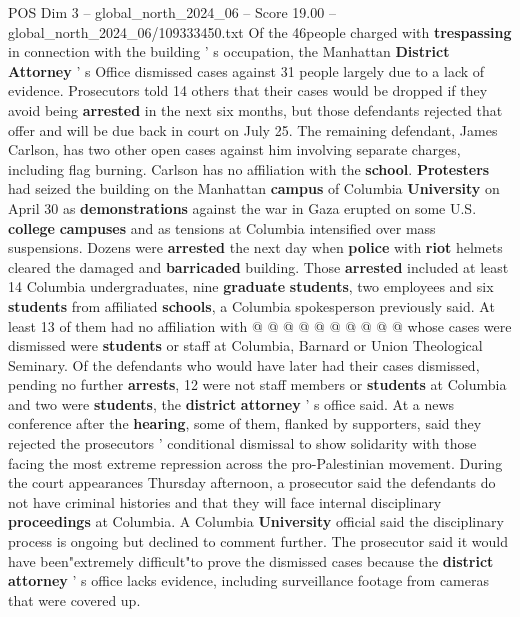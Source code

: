 \begin{textsample}{POS Dim 3 – global\_north\_2024\_06 – Score 19.00 – global\_north\_2024\_06/109333450.txt}  \label{ex:f3_pos_080}
Of the 46people charged with \textbf{trespassing} in connection with the building ' s occupation, the Manhattan \textbf{District} \textbf{Attorney} ' s Office dismissed cases against 31 people largely due to a lack of evidence.
Prosecutors told 14 others that their cases would be dropped if they avoid being \textbf{arrested} in the next six months, but those defendants rejected that offer and will be due back in court on July 25.
The remaining defendant, James Carlson, has two other open cases against him involving separate charges, including flag burning.
Carlson has no affiliation with the \textbf{school}. \textbf{Protesters} had seized the building on the Manhattan \textbf{campus} of Columbia \textbf{University} on April 30 as \textbf{demonstrations} against the war in Gaza erupted on some U.S. \textbf{college} \textbf{campuses} and as tensions at Columbia intensified over mass suspensions.
Dozens were \textbf{arrested} the next day when \textbf{police} with \textbf{riot} helmets cleared the damaged and \textbf{barricaded} building.
Those \textbf{arrested} included at least 14 Columbia undergraduates, nine \textbf{graduate} \textbf{students}, two employees and six \textbf{students} from affiliated \textbf{schools}, a Columbia spokesperson previously said.
At least 13 of them had no affiliation with @ @ @ @ @ @ @ @ @ @ whose cases were dismissed were \textbf{students} or staff at Columbia, Barnard or Union Theological Seminary.
Of the defendants who would have later had their cases dismissed, pending no further \textbf{arrests}, 12 were not staff members or \textbf{students} at Columbia and two were \textbf{students}, the \textbf{district} \textbf{attorney} ' s office said.
At a news conference after the \textbf{hearing}, some of them, flanked by supporters, said they rejected the prosecutors ' conditional dismissal to show solidarity with those facing the most extreme repression across the pro-Palestinian movement.
During the court appearances Thursday afternoon, a prosecutor said the defendants do not have criminal histories and that they will face internal disciplinary \textbf{proceedings} at Columbia.
A Columbia \textbf{University} official said the disciplinary process is ongoing but declined to comment further.
The prosecutor said it would have been"extremely difficult"to prove the dismissed cases because the \textbf{district} \textbf{attorney} ' s office lacks evidence, including surveillance footage from cameras that were covered up.

\end{textsample}
